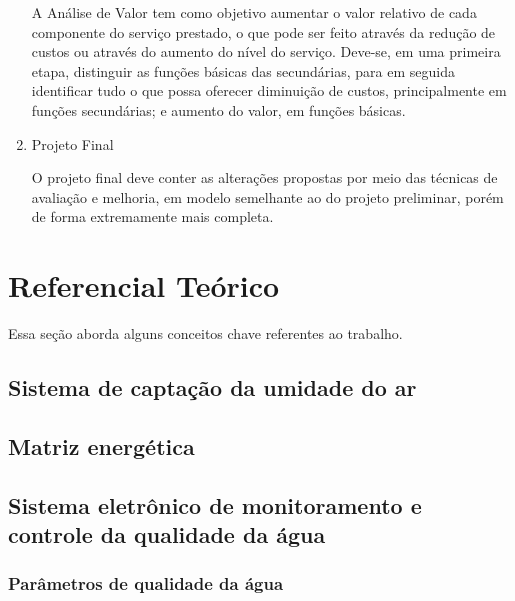 \begin{enumerate}
    A Análise de Valor tem como objetivo aumentar o valor relativo de cada componente do serviço prestado, o que pode 
    ser feito através da redução de custos ou através do aumento do nível do serviço. Deve-se, em uma primeira etapa,
    distinguir as funções básicas das secundárias, para em seguida identificar tudo o que possa oferecer diminuição de custos,
    principalmente em funções secundárias; e aumento do valor, em funções básicas.
    
  \item Projeto Final
  
    O projeto final deve conter as alterações propostas por meio das técnicas de avaliação e melhoria, em modelo semelhante
    ao do projeto preliminar, porém de forma extremamente mais completa.
    
  \end{enumerate}

  
  \section{Referencial Teórico}
  
    Essa seção aborda alguns conceitos chave referentes ao trabalho.
    
    \subsection{Sistema de captação da umidade do ar}
    
      
    
    \subsection{Matriz energética}
    
      
    
    \subsection{Sistema eletrônico de monitoramento e controle da qualidade da água}
      
      \subsubsection{Parâmetros de qualidade da água}
        
        
        
